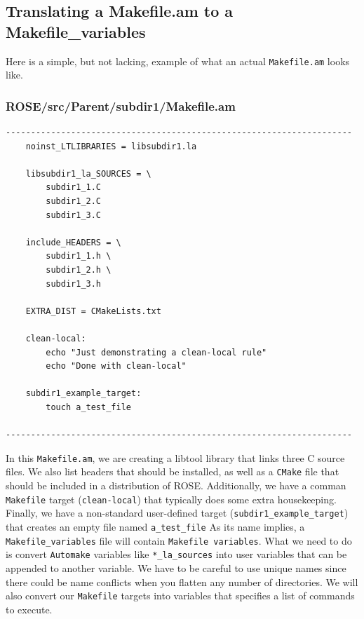 %

    \subsection{Translating a Makefile.am to a Makefile\_variables}

%
Here is a simple, but not lacking, example of what an actual \texttt{Makefile.am} looks like.
\subsubsection{ROSE/src/Parent/subdir1/Makefile.am}
    \begin{verbatim}
---------------------------------------------------------------------
    noinst_LTLIBRARIES = libsubdir1.la

    libsubdir1_la_SOURCES = \
        subdir1_1.C
        subdir1_2.C
        subdir1_3.C 

    include_HEADERS = \
        subdir1_1.h \
        subdir1_2.h \
        subdir1_3.h

    EXTRA_DIST = CMakeLists.txt

    clean-local:
        echo "Just demonstrating a clean-local rule"
        echo "Done with clean-local"

    subdir1_example_target:
        touch a_test_file

---------------------------------------------------------------------
    \end{verbatim}
In this \texttt{Makefile.am}, we are creating a libtool library that links three C source files. We
also list headers that should be installed, as well as a \texttt{CMake} file that should be
included in a distribution of ROSE. Additionally, we have a comman \texttt{Makefile} target
(\texttt{clean-local}) that typically does some extra housekeeping. Finally, we have a non-standard
user-defined target (\texttt{subdir1\_example\_target}) that creates an empty file named
\texttt{a\_test\_file}
\newline\newline
As its name implies, a \texttt{Makefile\_variables} file will contain \texttt{Makefile variables}.
What we need to do is convert \texttt{Automake} variables like \texttt{*\_la\_sources} into user
variables that can be appended to another variable. We have to be careful to use unique names
since there could be name conflicts when you flatten any number of directories. We will also
convert our \texttt{Makefile} targets into variables that specifies a list of commands to execute.

